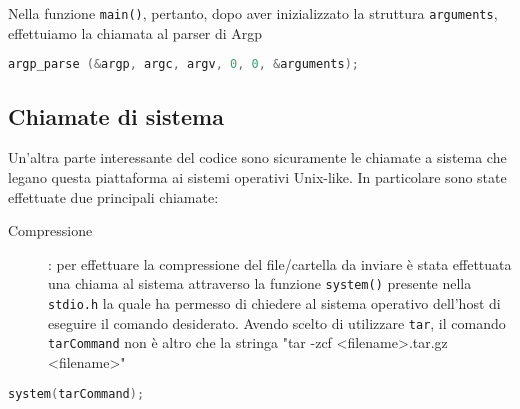 \documentclass[11pt,fleqn]{book} %
\begin{document}
\noindent Nella funzione \texttt{main()}, pertanto, dopo aver inizializzato la struttura \texttt{arguments}, effettuiamo la chiamata al parser di Argp

\begin{lstlisting}[language=C]
argp_parse (&argp, argc, argv, 0, 0, &arguments);
\end{lstlisting}


\subsection{Chiamate di sistema}
Un'altra parte interessante del codice sono sicuramente le chiamate a sistema che legano questa piattaforma ai sistemi operativi Unix-like.
In particolare sono state effettuate due principali chiamate:
\medskip
\begin{description}
	\item[Compressione]: per effettuare la compressione del file/cartella da inviare è stata effettuata una chiama al sistema attraverso la funzione 			\texttt{system()} presente nella \texttt{stdio.h} la quale ha permesso di chiedere al sistema operativo dell'host di eseguire il comando 				desiderato. Avendo scelto di utilizzare \texttt{tar}, il comando \texttt{tarCommand} non è altro che la stringa "tar -zcf <filename>.tar.gz 			<filename>"
\end{description}

\begin{lstlisting}[language=C]
	system(tarCommand);
\end{lstlisting}
\end{document}
